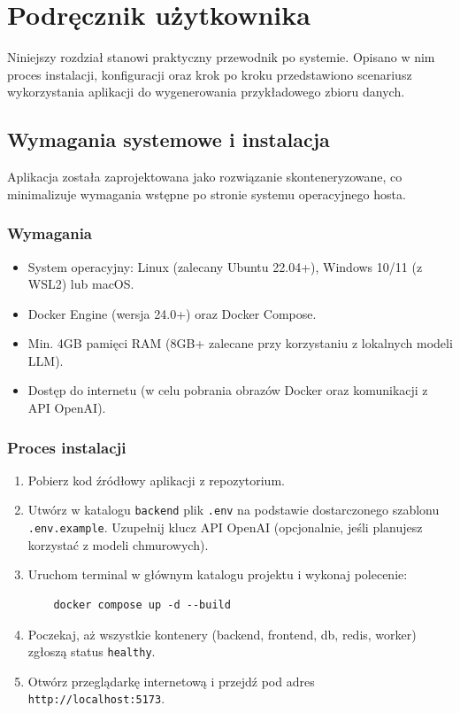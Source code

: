 \chapter{Podręcznik użytkownika}
\label{cha:user_manual}

Niniejszy rozdział stanowi praktyczny przewodnik po systemie. Opisano w nim proces instalacji, konfiguracji oraz krok po kroku przedstawiono scenariusz wykorzystania aplikacji do wygenerowania przykładowego zbioru danych.

\section*{Wymagania systemowe i instalacja}
Aplikacja została zaprojektowana jako rozwiązanie skonteneryzowane, co minimalizuje wymagania wstępne po stronie systemu operacyjnego hosta.

\subsection*{Wymagania}
\begin{itemize}
    \item System operacyjny: Linux (zalecany Ubuntu 22.04+), Windows 10/11 (z \gls{WSL2}) lub macOS.
    \item Docker Engine (wersja 24.0+) oraz Docker Compose.
    \item Min. 4GB pamięci \gls{RAM} (8GB+ zalecane przy korzystaniu z lokalnych modeli \gls{LLM}).
    \item Dostęp do internetu (w celu pobrania obrazów Docker oraz komunikacji z \gls{API} OpenAI).
\end{itemize}

\subsection*{Proces instalacji}
\begin{enumerate}
    \item Pobierz kod źródłowy aplikacji z repozytorium.
    \item Utwórz w katalogu \texttt{backend} plik \texttt{.env} na podstawie dostarczonego szablonu \texttt{.env.example}. Uzupełnij klucz \gls{API} OpenAI (opcjonalnie, jeśli planujesz korzystać z modeli chmurowych).
    \item Uruchom terminal w głównym katalogu projektu i wykonaj polecenie:
          \begin{verbatim}
    docker compose up -d --build
    \end{verbatim}
    \item Poczekaj, aż wszystkie kontenery (backend, frontend, db, redis, worker) zgłoszą status \texttt{healthy}.
    \item Otwórz przeglądarkę internetową i przejdź pod adres \texttt{http://localhost:5173}.
\end{enumerate}

